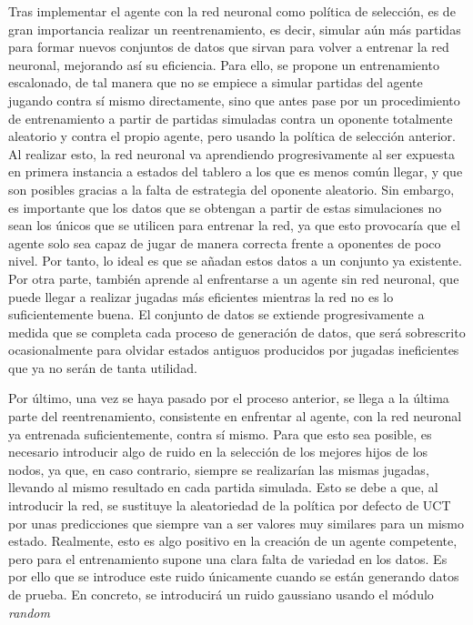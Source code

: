 \documentclass[conference,a4paper]{IEEEtran}
\begin{document}
Tras implementar el agente con la red neuronal como política de selección, es de gran importancia realizar un reentrenamiento, es decir, simular aún más partidas 
para formar nuevos conjuntos de datos que sirvan para volver a entrenar la red neuronal, mejorando así su eficiencia. Para ello, se propone un entrenamiento escalonado, 
de tal manera que no se empiece a simular partidas del agente jugando contra sí mismo directamente, sino que antes pase por un procedimiento de entrenamiento a partir 
de partidas simuladas contra un oponente totalmente aleatorio y contra el propio agente, pero usando la política de selección anterior. Al realizar esto, la red neuronal 
va aprendiendo progresivamente al ser expuesta en primera instancia a estados del tablero a los que es menos común llegar, y que son posibles gracias a la falta de 
estrategia del oponente aleatorio. Sin embargo, es importante que los datos que se obtengan a partir de estas simulaciones no sean los únicos que se utilicen para entrenar 
la red, ya que esto provocaría que el agente solo sea capaz de jugar de manera correcta frente a oponentes de poco nivel. Por tanto, lo ideal es que se añadan estos datos 
a un conjunto ya existente. Por otra parte, también aprende al enfrentarse a un agente sin red neuronal, que puede llegar a realizar jugadas más eficientes mientras la red 
no es lo suficientemente buena. El conjunto de datos se extiende progresivamente a medida que se completa cada proceso de generación de datos, que será sobrescrito 
ocasionalmente para olvidar estados antiguos producidos por jugadas ineficientes que ya no serán de tanta utilidad.

Por último, una vez se haya pasado por el proceso anterior, se llega a la última parte del reentrenamiento, consistente en enfrentar al agente, 
con la red neuronal ya entrenada suficientemente, contra sí mismo. Para que esto sea posible, es necesario introducir algo de ruido en la selección 
de los mejores hijos de los nodos, ya que, en caso contrario, siempre se realizarían las mismas jugadas, llevando al mismo resultado en cada partida simulada. 
Esto se debe a que, al introducir la red, se sustituye la aleatoriedad de la política por defecto de UCT por unas predicciones que siempre van a ser 
valores muy similares para un mismo estado. Realmente, esto es algo positivo en la creación de un agente competente, pero para el entrenamiento supone una 
clara falta de variedad en los datos. Es por ello que se introduce este ruido únicamente cuando se están generando datos de prueba. En concreto, se introducirá 
un ruido gaussiano usando el módulo \emph{random}~\cite{b16}
\end{document}
